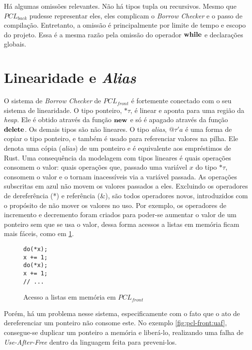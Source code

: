 Há algumas omissões relevantes. Não há tipos tupla ou recursivos. Mesmo que $PCL_{back}$ pudesse representar eles, eles complicam o \emph{Borrow Checker} e o passo de compilação. Entretanto, a omissão é principalmente por limite de tempo e escopo do projeto. Essa é a mesma razão pela omissão do operador $\mathbf{while}$ e declarações globais.


\section{Linearidade e \emph{Alias}}

O sistema de \emph{Borrow Checker} de $PCL_{front}$ é fortemente conectado com o seu sistema de linearidade. O tipo ponteiro, $\text{*}\!\tau$, é linear e aponta para uma região da \emph{heap}. Ele é obtido através da função $\mathbf{new}$ e só é apagado através da função $\mathbf{delete}$. Os demais tipos são não lineares. O tipo \emph{alias}, $@\tau'a$ é uma forma de copiar o tipo ponteiro, e também é usado para referenciar valores na pilha. Ele denota uma cópia (\emph{alias}) de um ponteiro e é equivalente aos empréstimos de Rust. Uma consequência da modelagem com tipos lineares é quais operações consomem o valor: quais operações que, passado uma variável $x$ do tipo $\text{*}\!\tau$, consomem o valor e o tornam inacessíveis via a variável passada. As operações subscritas em {\color{blue}azul} não movem os valores passados a eles. Excluindo os operadores de dereferência (*) e referência (\&), são todos operadores novos, introduzidos com o propósito de não mover os valores no uso. Por exemplo, os operadores de incremento e decremento foram criados para poder-se aumentar o valor de um ponteiro sem que se usa o valor, dessa forma acessos a listas em memória ficam mais fáceis, como em \ref{fig:pcl-front:inc}.

\begin{figure}[ht]
	\caption{Acesso a listas em memória em $PCL_{front}$}
	\label{fig:pcl-front:inc}
	\begin{lstlisting}[language=PCLfront]
do(*x);
x += 1;
do(*x);
x += 1;
// ...
	\end{lstlisting}
\end{figure}

Porém, há um problema nesse sistema, especificamente com o fato que o ato de dereferenciar um ponteiro não consome este. No exemplo \ref{fig:pcl-front:uaf}, consegue-se duplicar um ponteiro a memória e liberá-lo, realizando uma falha de \emph{Use-After-Free} dentro da linguagem feita para preveni-los.

